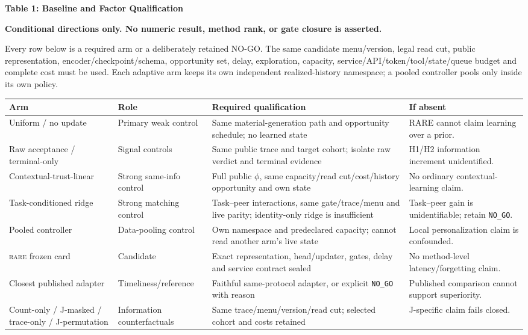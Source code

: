 \documentclass[10pt,a4paper]{article}
\newcommand{\rare}{\textsc{rare}}
\newcommand{\caution}{\textcolor{red!70!black}{\textbf{Conditional directions only. No numeric result, method rank, or gate closure is asserted.}}\par}
\begin{document}
\clearpage
{\large\bfseries Table 1: Baseline and Factor Qualification}\par\caution
Every row below is a required arm or a deliberately retained NO-GO. The same candidate
menu/version, legal read cut, public representation, encoder/checkpoint/schema,
opportunity set, delay, exploration, capacity, service/API/token/tool/state/queue
budget and complete cost must be used. Each adaptive arm keeps its own independent
realized-history namespace; a pooled controller pools only inside its own policy.

\begin{center}\scriptsize
\begin{tabularx}{\linewidth}{@{}L{.23\linewidth}L{.18\linewidth}X L{.19\linewidth}@{}}\toprule
Arm & Role & Required qualification & If absent\\\midrule
Uniform / no update & Primary weak control & Same material-generation path and opportunity schedule; no learned state & RARE cannot claim learning over a prior.\\
Raw acceptance / terminal-only & Signal controls & Same public trace and target cohort; isolate raw verdict and terminal evidence & H1/H2 information increment unidentified.\\
Contextual-trust-linear & Strong same-info control & Full public $\phi$, same capacity/read cut/cost/history opportunity and own state & No ordinary contextual-learning claim.\\
Task-conditioned ridge & Strong matching control & Task--peer interactions, same gate/trace/menu and live parity; identity-only ridge is insufficient & Task--peer gain is unidentifiable; retain \texttt{NO\_GO}.\\
Pooled controller & Data-pooling control & Own namespace and predeclared capacity; cannot read another arm's live state & Local personalization claim is confounded.\\
\rare{} frozen card & Candidate & Exact representation, head/updater, gates, delay and service contract sealed & No method-level latency/forgetting claim.\\
Closest published adapter & Timeliness/reference & Faithful same-protocol adapter, or explicit \texttt{NO\_GO} with reason & Published comparison cannot support superiority.\\
Count-only / J-masked / trace-only / J-permutation & Information counterfactuals & Same trace/menu/version/read cut; selected cohort and costs retained & J-specific claim fails closed.\\\bottomrule
\end{tabularx}\end{center}
\end{document}
